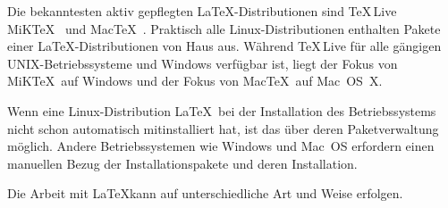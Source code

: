 Die bekanntesten aktiv gepflegten \LaTeX-Distributionen sind \TeX\,Live~\cite{TeXLive_Webpage} MiK\TeX~\cite{MiKTeX_Webpage} und Mac\TeX~\cite{MacTeX_Webpage}. 
Praktisch alle Linux-Distributionen enthalten Pakete einer \LaTeX-Distributionen von Haus aus. Während \TeX\,Live für alle gängigen UNIX-Betriebssysteme und Windows verfügbar ist, liegt der Fokus von MiK\TeX\ auf Windows und der Fokus von Mac\TeX\ auf Mac~OS~X.

Wenn eine Linux-Distribution \LaTeX\ bei der Installation des Betriebssystems nicht schon automatisch mitinstalliert hat, ist das über deren Paketverwaltung möglich. Andere Betriebssystemen wie Windows und Mac~OS erfordern einen manuellen Bezug der Installationspakete und deren Installation.

Die Arbeit mit \LaTeX kann auf unterschiedliche Art und Weise erfolgen.


